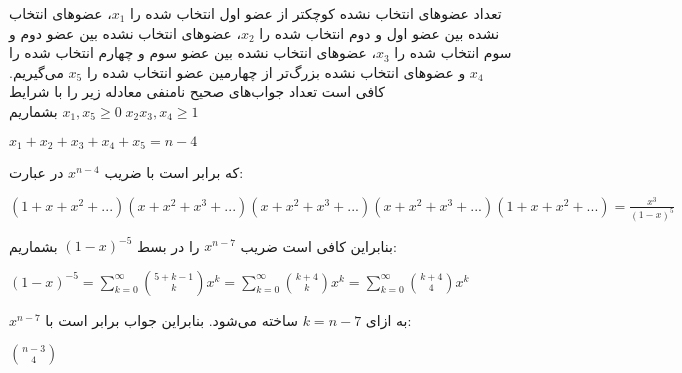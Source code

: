 \p
تعداد عضو‌های  انتخاب نشده کوچکتر از عضو اول انتخاب شده را 
                $x_1$،
                عضوهای انتخاب نشده بین عضو اول و دوم انتخاب شده را
                $x_2$،
                عضو‌های انتخاب نشده بین عضو دوم و سوم انتخاب شده را
                $x_3$،
                عضو‌های انتخاب نشده بین عضو سوم و چهارم انتخاب شده را
                $x_4$ و
                عضوهای انتخاب نشده بزرگ‌تر از چهارمین عضو انتخاب شده را 
                $x_5$
                می‌گیریم. کافی است تعداد جواب‌های صحیح نامنفی معادله زیر را با شرایط 
                $x_1, x_5 \geq 0 \; x_2 x_3, x_4 \geq 1$
                بشماریم
                \begin{center}
                $x_1 + x_2 + x_3 + x_4 + x_5 = n - 4$\\
                \end{center}
                که برابر است با ضریب
                $x^{n - 4}$
                در عبارت:\\
                \begin{center}
                $(1 + x + x^2 + ...)(x + x^2 + x^3 + ...)(x + x^2 + x^3 + ...)(x + x^2 + x^3 + ...)(1 + x + x^2 + ...) = \frac{x^3}{(1 - x)^5}$
                \end{center}
                 بنابراین کافی است ضریب $x^{n - 7}$ را در بسط $(1 - x)^{-5}$ بشماریم:\\
                \begin{center}
                    $(1 - x)^{-5} = \sum_{k = 0}^{\infty} \binom{5 + k - 1}{k}x^k
                    = \sum_{k = 0}^{\infty} \binom{k + 4}{k}x^k
                    = \sum_{k = 0}^{\infty} \binom{k + 4}{4}x^k$
                \end{center}
                $x^{n - 7}$ به ازای $k = n -7$ ساخته می‌شود. بنابراین جواب برابر است با:\\
                \begin{center}
                    $\binom{n - 3}{4}$
                \end{center}